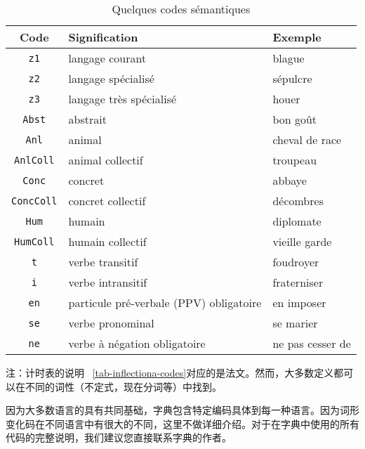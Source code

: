 \begin{table}[!h]
\begin{center}
\begin{tabular}{|c|l|l|}
\hline
\textbf{Code} & \textbf{Signification} & \textbf{Exemple} \\
\hline
\verb+z1+ & langage courant & blague \\
\hline
\verb+z2+ & langage spécialisé & sépulcre \\
\hline
\verb+z3+ & langage très spécialisé & houer \\
\hline
\verb+Abst+ & abstrait & bon goût \\
\hline
\verb+Anl+ & animal & cheval de race \\
\hline
\verb+AnlColl+ & animal collectif & troupeau \\
\hline
\verb+Conc+ & concret & abbaye \\
\hline
\verb+ConcColl+ & concret collectif & décombres \\
\hline
\verb+Hum+ & humain & diplomate \\
\hline
\verb+HumColl+ & humain collectif & vieille garde \\
\hline
\verb+t+ & verbe transitif & foudroyer \\
\hline
\verb+i+ & verbe intransitif & fraterniser \\
\hline
\verb+en+ & particule pré-verbale (PPV) obligatoire & en imposer \\
\hline
\verb+se+ & verbe pronominal & se marier \\
\hline
\verb+ne+ & verbe à négation obligatoire & ne pas cesser de \\
\hline
\end{tabular}
\caption{Quelques codes sémantiques\label{tab-semantic-codes}}
\end{center}
\end{table}

\noindent 注：计时表的说明 ~\ref{tab-inflectiona-codes}对应的是法文。然而，大多数定义都可以在不同的词性（不定式，现在分词等）中找到。


\bigskip
\noindent 因为大多数语言的具有共同基础，字典包含特定编码具体到每一种语言。因为词形变化码在不同语言中有很大的不同，这里不做详细介绍。对于在字典中使用的所有代码的完整说明，我们建议您直接联系字典的作者。


